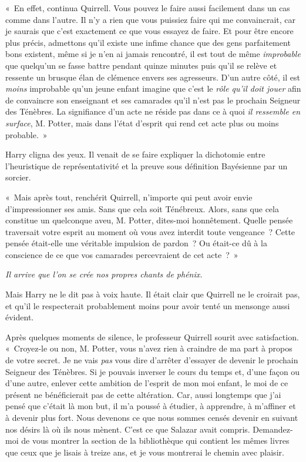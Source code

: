 «~En effet, continua Quirrell.
Vous pouvez le faire aussi facilement dans un cas comme dans l'autre.
Il n'y a rien que vous puissiez faire qui me convaincrait, car je saurais que c'est exactement ce que vous essayez de faire.
Et pour être encore plus précis, admettons qu'il existe une infime chance que des gens parfaitement bons existent, même si je n'en ai jamais rencontré, il est tout de même \emph{improbable} que quelqu'un se fasse battre pendant quinze minutes puis qu'il se relève et ressente un brusque élan de clémence envers ses agresseurs.
D'un autre côté, il est \emph{moins} improbable qu'un jeune enfant imagine que c'est le \emph{rôle qu'il doit jouer} afin de convaincre son enseignant et ses camarades qu'il n'est pas le prochain Seigneur des Ténèbres.
La signifiance d'un acte ne réside pas dans ce à quoi \emph{il ressemble en surface}, M. Potter, mais dans l'état d'esprit qui rend cet acte plus ou moins probable.~»

Harry cligna des yeux.
Il venait de se faire expliquer la dichotomie entre l'heuristique de représentativité et la preuve sous définition Bayésienne par un sorcier.

«~Mais après tout, renchérit Quirrell, n'importe qui peut avoir envie d'impressionner ses amis.
Sans que cela soit Ténébreux.
Alors, sans que cela constitue un quelconque aveu, M. Potter, dites-moi honnêtement.
Quelle pensée traversait votre esprit au moment où vous avez interdit toute vengeance~?
Cette pensée était-elle une véritable impulsion de pardon~?
Ou était-ce dû à la conscience de ce que vos camarades percevraient de cet acte~?~»

\emph{Il arrive que l'on se crée nos propres chants de phénix.}

Mais Harry ne le dit pas à voix haute.
Il était clair que Quirrell ne le croirait pas, et qu'il le respecterait probablement moins pour avoir tenté un mensonge aussi évident.

Après quelques moments de silence, le professeur Quirrell sourit avec satisfaction.
«~Croyez-le ou non, M. Potter, vous n'avez rien à craindre de ma part à propos de votre secret.
Je ne vais \emph{pas} vous dire d'arrêter d'essayer de devenir le prochain Seigneur des Ténèbres.
Si je pouvais inverser le cours du temps et, d'une façon ou d'une autre, enlever cette ambition de l'esprit de mon moi enfant, le moi de ce présent ne bénéficierait pas de cette altération.
Car, aussi longtemps que j'ai pensé que c'était là mon but, il m'a poussé à étudier, à apprendre, à m'affiner et à devenir plus fort.
Nous devenons ce que nous sommes censés devenir en suivant nos désirs là où ils nous mènent.
C'est ce que Salazar avait compris.
Demandez-moi de vous montrer la section de la bibliothèque qui contient les mêmes livres que ceux que je lisais à treize ans, et je vous montrerai le chemin avec plaisir.

